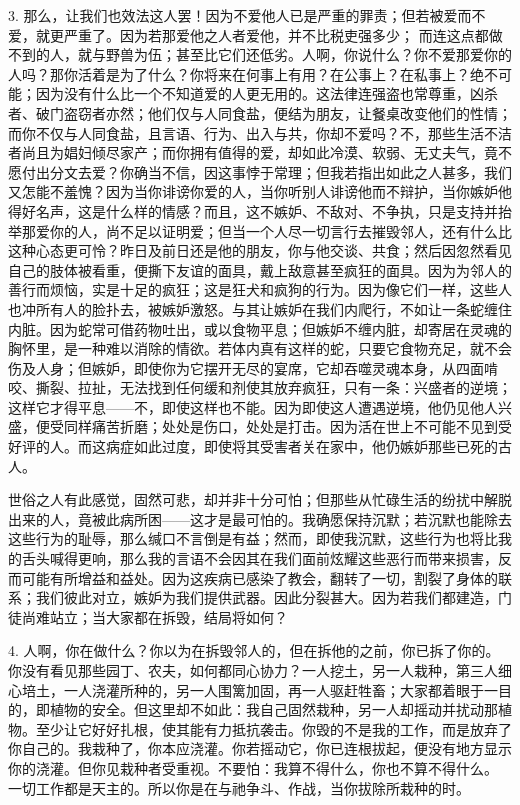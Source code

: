 3. 那么，让我们也效法这人罢！因为不爱他人已是严重的罪责；但若被爱而不爱，就更严重了。因为若那爱他之人者爱他，并不比税吏强多少； 而连这点都做不到的人，就与野兽为伍；甚至比它们还低劣。人啊，你说什么？你不爱那爱你的人吗？那你活着是为了什么？你将来在何事上有用？在公事上？在私事上？绝不可能；因为没有什么比一个不知道爱的人更无用的。这法律连强盗也常尊重，凶杀者、破门盗窃者亦然；他们仅与人同食盐，便结为朋友，让餐桌改变他们的性情；而你不仅与人同食盐，且言语、行为、出入与共，你却不爱吗？不，那些生活不洁者尚且为娼妇倾尽家产；而你拥有值得的爱，却如此冷漠、软弱、无丈夫气，竟不愿付出分文去爱？你确当不信，因这事悖于常理；但我若指出如此之人甚多，我们又怎能不羞愧？因为当你诽谤你爱的人，当你听别人诽谤他而不辩护，当你嫉妒他得好名声，这是什么样的情感？而且，这不嫉妒、不敌对、不争执，只是支持并抬举那爱你的人，尚不足以证明爱；但当一个人尽一切言行去摧毁邻人，还有什么比这种心态更可怜？昨日及前日还是他的朋友，你与他交谈、共食；然后因忽然看见自己的肢体被看重，便撕下友谊的面具，戴上敌意甚至疯狂的面具。因为为邻人的善行而烦恼，实是十足的疯狂；这是狂犬和疯狗的行为。因为像它们一样，这些人也冲所有人的脸扑去，被嫉妒激怒。与其让嫉妒在我们内爬行，不如让一条蛇缠住内脏。因为蛇常可借药物吐出，或以食物平息；但嫉妒不缠内脏，却寄居在灵魂的胸怀里，是一种难以消除的情欲。若体内真有这样的蛇，只要它食物充足，就不会伤及人身；但嫉妒，即使你为它摆开无尽的宴席，它却吞噬灵魂本身，从四面啃咬、撕裂、拉扯，无法找到任何缓和剂使其放弃疯狂，只有一条：兴盛者的逆境；这样它才得平息——不，即使这样也不能。因为即使这人遭遇逆境，他仍见他人兴盛，便受同样痛苦折磨；处处是伤口，处处是打击。因为活在世上不可能不见到受好评的人。而这病症如此过度，即使将其受害者关在家中，他仍嫉妒那些已死的古人。\par

世俗之人有此感觉，固然可悲，却并非十分可怕；但那些从忙碌生活的纷扰中解脱出来的人，竟被此病所困——这才是最可怕的。我确愿保持沉默；若沉默也能除去这些行为的耻辱，那么缄口不言倒是有益；然而，即使我沉默，这些行为也将比我的舌头喊得更响，那么我的言语不会因其在我们面前炫耀这些恶行而带来损害，反而可能有所增益和益处。因为这疾病已感染了教会，翻转了一切，割裂了身体的联系；我们彼此对立，嫉妒为我们提供武器。因此分裂甚大。因为若我们都建造，门徒尚难站立；当大家都在拆毁，结局将如何？\par

4. 人啊，你在做什么？你以为在拆毁邻人的，但在拆他的之前，你已拆了你的。你没有看见那些园丁、农夫，如何都同心协力？一人挖土，另一人栽种，第三人细心培土，一人浇灌所种的，另一人围篱加固，再一人驱赶牲畜；大家都着眼于一目的，即植物的安全。但这里却不如此：我自己固然栽种，另一人却摇动并扰动那植物。至少让它好好扎根，使其能有力抵抗袭击。你毁的不是我的工作，而是放弃了你自己的。我栽种了，你本应浇灌。你若摇动它，你已连根拔起，便没有地方显示你的浇灌。但你见栽种者受重视。不要怕：我算不得什么，你也不算不得什么。 一切工作都是天主的。所以你是在与祂争斗、作战，当你拔除所栽种的时。\par

